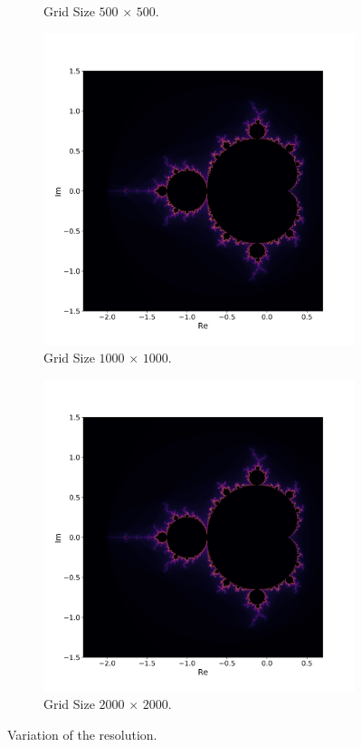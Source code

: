 \documentclass[
  12pt,					%
  a4paper,				%
  twoside,				%
]{report}
\begin{document}
\begin{figure}[H]
\begin{subfigure}{.45\textwidth}
  \caption{Grid Size $500 \, \times \, 500$.}
\end{subfigure}
\begin{subfigure}{.45\textwidth}
  \centering
  \includegraphics[width=\linewidth]{IMG/Res3.png}
  \caption{Grid Size $1000 \, \times \, 1000$.}
\end{subfigure}
\begin{subfigure}{.45\textwidth}
  \centering
  \includegraphics[width=\linewidth]{IMG/Res4.png}
  \caption{Grid Size $2000 \, \times \, 2000$.}
\end{subfigure}
\caption{Variation of the resolution.}
\label{FIG_Resolution}
\end{figure}
\end{document}
